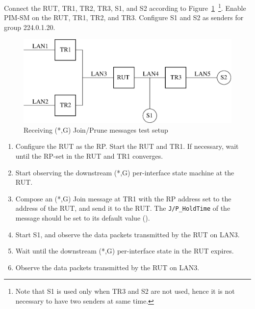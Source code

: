 \documentclass[11pt]{report}
\begin{document}
Connect the RUT, TR1, TR2, TR3, S1, and S2 according to
Figure~\ref{fig:pim_test_4_2_receiving_wc_join_prune_messages}~\footnote{Note
that S1 is used only when TR3 and S2 are not used, hence it is not necessary
to have two senders at same time.}.
Enable PIM-SM on the RUT, TR1, TR2, and TR3.
Configure S1 and S2 as senders for group 224.0.1.20.

\begin{figure}[htbp]
  \begin{center}
    \includegraphics[scale=0.8]{figs/pim_test_4_2_receiving_wc_join_prune_messages}
    \caption{Receiving (*,G) Join/Prune messages test setup}
    \label{fig:pim_test_4_2_receiving_wc_join_prune_messages}
  \end{center}
\end{figure}



\begin{enumerate}

  \item Configure the RUT as the RP. Start the RUT and TR1. If
  necessary, wait until the RP-set in the RUT and TR1 converges.

  \item Start observing the downstream (*,G) per-interface state
  machine at the RUT.

  \item Compose an (*,G) Join message at TR1 with the RP address set
  to the address of the RUT, and send it to the RUT.
  The \verb=J/P_HoldTime= of the message should be set to its default
  value ({\PimsmJPHoldTime}).

  \item Start S1, and observe the data packets transmitted by the RUT on
  LAN3.

  \item Wait until the downstream (*,G) per-interface state in the RUT
  expires.

  \item Observe the data packets transmitted by the RUT on LAN3.

\end{enumerate}
\end{document}
